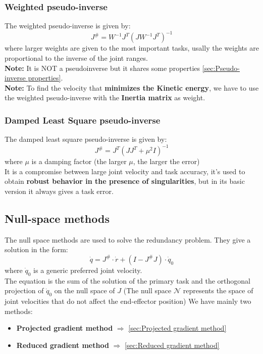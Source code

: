 \documentclass[a4paper,12pt]{article}
\begin{document}
\subsubsection{Weighted pseudo-inverse}\label{sec:Weighted pseudo-inverse}
The weighted pseudo-inverse is given by:
\begin{equation}
    J^\# = W^{-1} J^T(J W^{-1} J^T)^{-1}
\end{equation}
where larger weights are given to the most important tasks, usally 
the weights are proportional to the inverse of the joint ranges.\\
\textbf{Note:} It is NOT a pseudoinverse but it shares some properties \ref{sec:Pseudo-inverse properties}.\\
\textbf{Note:} To find the velocity that \textbf{minimizes the Kinetic energy}, we have to
use the weighted pseudo-inverse with the \textbf{Inertia matrix} as weight.

\subsubsection{Damped Least Square pseudo-inverse}\label{sec:Damped Least Square pseudo-inverse}
The damped least square pseudo-inverse is given by:
\begin{equation}
    J^\# = J^T(J J^T + \mu^2 I)^{-1}
\end{equation}
where $\mu$ is a damping factor (the larger $\mu$, the larger the error)\\
It is a compromise between
large joint velocity
and task accuracy, it's used to obtain \textbf{robust behavior in the
 presence of singularities},
but in its basic version it always gives a task error.
\subsection{Null-space methods}
The null space methods are used to solve the redundancy problem.
They give a solution in the form: \begin{equation}
    \dot{q} = J^\# \cdot \dot{r} + (I - J^\# J) \cdot \dot{q}_0
\end{equation}
where $\dot{q}_0$ is a generic preferred joint velocity.\\
The equation is the sum of the solution of the primary task 
and the orthogonal projection of $\dot{q}_0$ on the null space of $J$ (The null space 
$\mathcal{N}$ represents the space of joint velocities that do not affect the end-effector position)
We have mainly two methods:
\begin{itemize}
    \item \textbf{Projected gradient method} $\Rightarrow$ \ref{sec:Projected gradient method}
    \item \textbf{Reduced gradient method} $\Rightarrow$ \ref{sec:Reduced gradient method}
\end{itemize}
\end{document}
